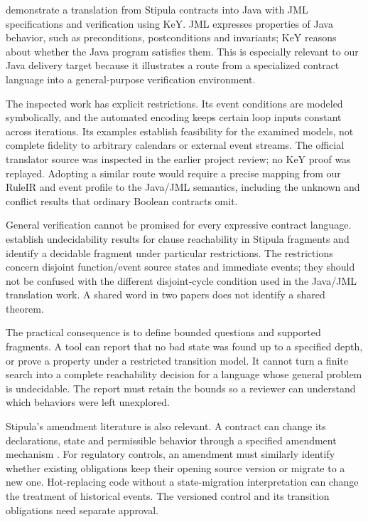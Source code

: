 \documentclass[12pt,a4paper,oneside,openany]{book}
\begin{document}
\citet{stipulakey2025} demonstrate a translation from Stipula contracts into
Java with JML specifications and verification using KeY. JML expresses properties
of Java behavior, such as preconditions, postconditions and invariants; KeY
reasons about whether the Java program satisfies them. This is especially
relevant to our Java delivery target because it illustrates a route from a
specialized contract language into a general-purpose verification environment.

The inspected work has explicit restrictions. Its event conditions are modeled
symbolically, and the automated encoding keeps certain loop inputs constant
across iterations. Its examples establish feasibility for the examined models,
not complete fidelity to arbitrary calendars or external event streams. The
official translator source was inspected in the earlier project review; no KeY
proof was replayed. Adopting a similar route would require a precise mapping
from our RuleIR and event profile to the Java/JML semantics, including the
unknown and conflict results that ordinary Boolean contracts omit.

General verification cannot be promised for every expressive contract language.
\citet{reachability2026} establish undecidability results for clause reachability
in Stipula fragments and identify a decidable fragment under particular
restrictions. The restrictions concern disjoint function/event source states
and immediate events; they should not be confused with the different
disjoint-cycle condition used in the Java/JML translation work. A shared word
in two papers does not identify a shared theorem.

The practical consequence is to define bounded questions and supported
fragments. A tool can report that no bad state was found up to a specified
depth, or prove a property under a restricted transition model. It cannot
turn a finite search into a complete reachability decision for a language
whose general problem is undecidable. The report must retain the bounds so a
reviewer can understand which behaviors were left unexplored.

Stipula's amendment literature is also relevant. A contract can change its
declarations, state and permissible behavior through a specified amendment
mechanism \citep[secs.~3--5]{amending2023}. For regulatory controls, an amendment
must similarly identify whether existing obligations keep their opening source
version or migrate to a new one. Hot-replacing code without a state-migration
interpretation can change the treatment of historical events. The versioned
control and its transition obligations need separate approval.
\end{document}

